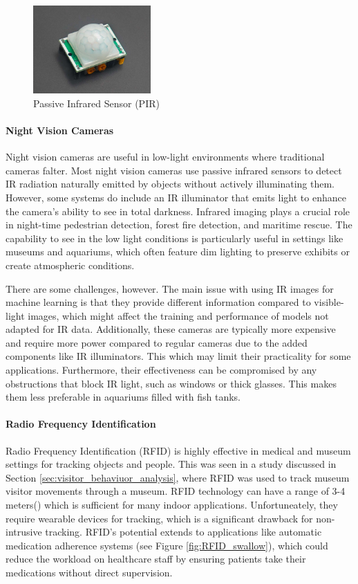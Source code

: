 \begin{figure}[H]    
    \centering
    \includegraphics[width=0.4\textwidth]{Images/PIR.jpg}
    \caption{Passive Infrared Sensor (PIR)}
    \label{fig:PIR}
\end{figure}

\paragraph{Night Vision Cameras}
Night vision cameras are useful in low-light environments where traditional cameras falter. Most night vision cameras use passive infrared sensors to detect IR radiation naturally emitted by objects without actively illuminating them. However, some systems do include an IR illuminator that emits light to enhance the camera's ability to see in total darkness. Infrared imaging plays a crucial role in night-time pedestrian detection, forest fire detection, and maritime rescue. The capability to see in the low light conditions is particularly useful in settings like museums and aquariums, which often feature dim lighting to preserve exhibits or create atmospheric conditions. 

There are some challenges, however. The main issue with using IR images for machine learning is that they provide different information compared to visible-light images, which might affect the training and performance of models not adapted for IR data. Additionally, these cameras are typically more expensive and require more power compared to regular cameras due to the added components like IR illuminators. This which may limit their practicality for some applications. Furthermore, their effectiveness can be compromised by any obstructions that block IR light, such as windows or thick glasses. This makes them less preferable in aquariums filled with fish tanks. 

\paragraph{Radio Frequency Identification}
Radio Frequency Identification (RFID) is highly effective in medical and museum settings for tracking objects and people. This was seen in a study discussed in Section \ref{sec:visitor_behaviuor_analysis}, where RFID was used to track museum visitor movements through a museum. RFID technology can have a range of 3-4 meters(\cite{he2020medicalRFID}) which is sufficient for many indoor applications. Unfortuneately, they require wearable devices for tracking, which is a significant drawback for non-intrusive tracking. RFID's potential extends to applications like automatic medication adherence systems (see Figure \ref{fig:RFID_swallow}), which could reduce the workload on healthcare staff by ensuring patients take their medications without direct supervision.

